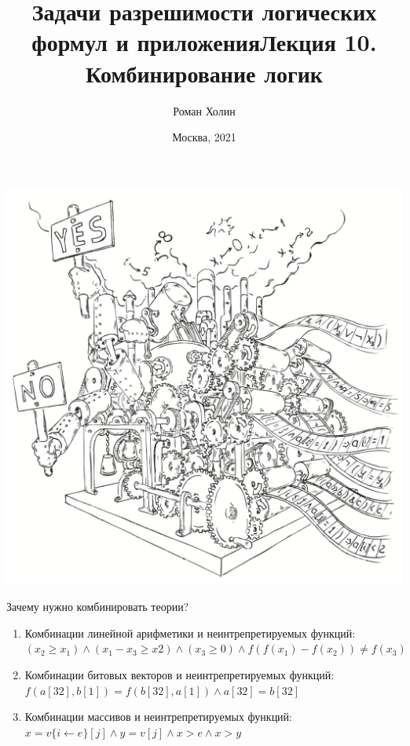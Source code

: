 \documentclass{beamer}
\begin{document}
\title{Задачи разрешимости логических формул и приложения\newline Лекция 10. Комбинирование логик}
\author{Роман Холин}
\date{Москва, 2021}

\begin{frame}
\includegraphics[scale=0.5]{../decision-procedure.png}
\end{frame}

\frame{\titlepage}

\begin{frame}{Зачему нужно комбинировать теории?}
\begin{enumerate}
\item Комбинации линейной арифметики и неинтрепретируемых функций:\newline
$(x_2 \ge x_1 ) \wedge (x_1 - x_3 \ge x 2 ) \wedge (x_3 \ge 0) \wedge f(f(x_1) - f(x_2)) \ne f(x_3)$
\item Комбинации битовых векторов и неинтрепретируемых функций:\newline
$f(a[32], b[1]) = f (b[32], a[1]) \wedge a[32] = b[32]$
\item Комбинации массивов и неинтрепретируемых функций:
$x = v\{i \leftarrow e\}[j] \wedge y = v[j] \wedge x > e \wedge x > y$
\end{enumerate}
\end{frame}
\end{document}
